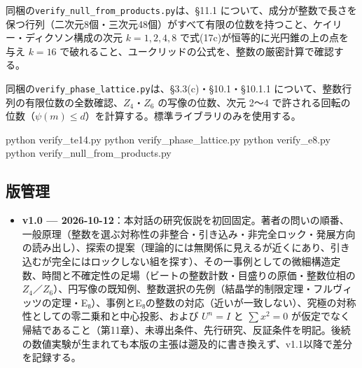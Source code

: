 \documentclass[
  a4paper,
]{ltjsarticle}
\newenvironment{Shaded}{}{}
\newcommand{\ExtensionTok}[1]{#1}
\newcommand{\NormalTok}[1]{#1}
\providecommand{\tightlist}{%
  \setlength{\itemsep}{0pt}\setlength{\parskip}{0pt}}
\begin{document}
同梱の\texttt{verify\_\allowbreak{}null\_\allowbreak{}from\_\allowbreak{}products.py}は、§11.1
について、成分が整数で長さを保つ行列（二次元8個・三次元48個）がすべて有限の位数を持つこと、ケイリー・ディクソン構成の次元
\(k=1,2,4,8\) で式(17c)が恒等的に光円錐の上の点を与え \(k=16\)
で破れること、ユークリッドの公式を、整数の厳密計算で確認する。

同梱の\texttt{verify\_\allowbreak{}phase\_\allowbreak{}lattice.py}は、§3.3(c)・§10.1・§10.1.1
について、整数行列の有限位数の全数確認、\(Z_4\)・\(Z_6\)
の写像の位数、次元 2〜4
で許される回転の位数（\(\psi(m)\le d\)）を計算する。標準ライブラリのみを使用する。

\begin{Shaded}
\begin{Highlighting}[]
\ExtensionTok{python}\NormalTok{ verify\_te14.py}
\ExtensionTok{python}\NormalTok{ verify\_phase\_lattice.py}
\ExtensionTok{python}\NormalTok{ verify\_e8.py}
\ExtensionTok{python}\NormalTok{ verify\_null\_from\_products.py}
\end{Highlighting}
\end{Shaded}

\subsection{版管理}\label{ux7248ux7ba1ux7406}

\begin{itemize}
\tightlist
\item
  \textbf{v1.0 ---
  2026-10-12}：本対話の研究仮説を初回固定。著者の問いの順番、一般原理（整数を選ぶ対称性の非整合・引き込み・非完全ロック・発展方向の読み出し）、探索の提案（理論的には無関係に見えるが近くにあり、引き込むが完全にはロックしない組を探す）、その一事例としての微細構造定数、時間と不確定性の足場（ビートの整数計数・目盛りの原価・整数位相の
  \(Z_4\)／\(Z_6\)）、円写像の既知例、整数選択の先例（結晶学的制限定理・フルヴィッツの定理・E₈）、事例とE₈の整数の対応（近いが一致しない）、究極の対称性としての零二乗和と中心投影、および
  \(U^n=I\) と \(\sum x^2=0\)
  が仮定でなく帰結であること（第11章）、未導出条件、先行研究、反証条件を明記。後続の数値実験が生まれても本版の主張は遡及的に書き換えず、v1.1以降で差分を記録する。
\end{itemize}
\end{document}
